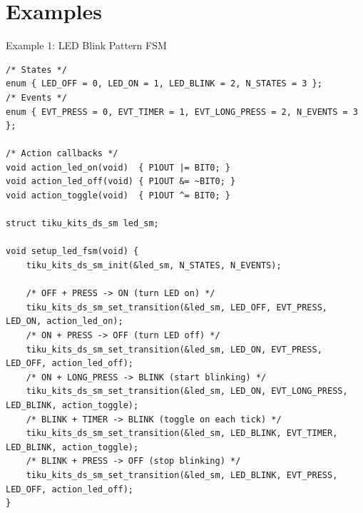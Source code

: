 \documentclass[aspectratio=169, 10pt]{beamer}
\begin{document}
\section{Examples}

\begin{frame}[fragile]{Example 1: LED Blink Pattern FSM}
\begin{lstlisting}[style=cstyle,
  title={examples/example\_ds\_sm.c --- LED blink controller}]
/* States */
enum { LED_OFF = 0, LED_ON = 1, LED_BLINK = 2, N_STATES = 3 };
/* Events */
enum { EVT_PRESS = 0, EVT_TIMER = 1, EVT_LONG_PRESS = 2, N_EVENTS = 3 };

/* Action callbacks */
void action_led_on(void)  { P1OUT |= BIT0; }
void action_led_off(void) { P1OUT &= ~BIT0; }
void action_toggle(void)  { P1OUT ^= BIT0; }

struct tiku_kits_ds_sm led_sm;

void setup_led_fsm(void) {
    tiku_kits_ds_sm_init(&led_sm, N_STATES, N_EVENTS);

    /* OFF + PRESS -> ON (turn LED on) */
    tiku_kits_ds_sm_set_transition(&led_sm, LED_OFF, EVT_PRESS, LED_ON, action_led_on);
    /* ON + PRESS -> OFF (turn LED off) */
    tiku_kits_ds_sm_set_transition(&led_sm, LED_ON, EVT_PRESS, LED_OFF, action_led_off);
    /* ON + LONG_PRESS -> BLINK (start blinking) */
    tiku_kits_ds_sm_set_transition(&led_sm, LED_ON, EVT_LONG_PRESS, LED_BLINK, action_toggle);
    /* BLINK + TIMER -> BLINK (toggle on each tick) */
    tiku_kits_ds_sm_set_transition(&led_sm, LED_BLINK, EVT_TIMER, LED_BLINK, action_toggle);
    /* BLINK + PRESS -> OFF (stop blinking) */
    tiku_kits_ds_sm_set_transition(&led_sm, LED_BLINK, EVT_PRESS, LED_OFF, action_led_off);
}
\end{lstlisting}
\end{frame}
\end{document}
